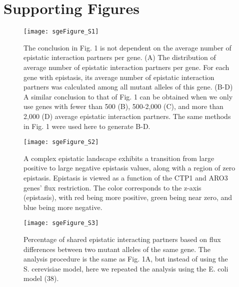 \section{Supporting Figures}

\begin{figure}[H]
\centering
  \texttt{[image: sgeFigure\_S1]}
\caption{The conclusion in Fig. 1 is not dependent on the average
number of epistatic interaction partners per gene. (A) The
distribution of average number of epistatic interaction partners per
gene. For each gene with epistasis, its average number of epistatic
interaction partners was calculated among all mutant alleles of this
gene. (B-D) A similar conclusion to that of Fig. 1 can be obtained
when we only use genes with fewer than 500 (B), 500-2,000 (C), and
more than 2,000 (D) average epistatic interaction partners. The same
methods in Fig. 1 were used here to generate B-D.}
\label{fig:sgeS1}
\end{figure}

\begin{figure}[H]
\centering
  \texttt{[image: sgeFigure\_S2]}
\caption{A complex epistatic landscape exhibits a transition from
large positive to large negative epistasis values, along with a region
of zero epistasis. Epistasis is viewed as a function of the CTP1 and
ARO3 genes’ flux restriction. The color corresponds to the z-axis
(epistasis), with red being more positive, green being near zero, and
blue being more negative.}
\label{fig:sgeS2}
\end{figure}

\begin{figure}[H]
\centering
  \texttt{[image: sgeFigure\_S3]}
\caption{Percentage of shared epistatic interacting partners based on
flux differences between two mutant alleles of the same gene. The
analysis procedure is the same as Fig. 1A, but instead of using the
S. cerevisiae model, here we repeated the analysis using the E. coli
model (38).}
\label{fig:sgeS3}
\end{figure}


\label{fig:sgeS4}

